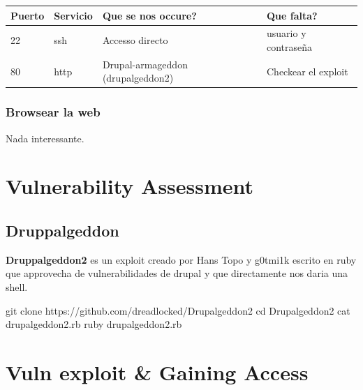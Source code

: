 \documentclass{assets/ipesethesis}
\newenvironment{Shaded}{\begin{snugshade}}{\end{snugshade}}
\newcommand{\BuiltInTok}[1]{#1}
\newcommand{\ExtensionTok}[1]{#1}
\newcommand{\FunctionTok}[1]{\textcolor[rgb]{0.00,0.00,0.00}{#1}}
\newcommand{\NormalTok}[1]{#1}
\begin{document}
\begin{longtable}[]{@{}llll@{}}
\toprule
Puerto & Servicio & Que se nos occure? & Que falta?\tabularnewline
\midrule
\endhead
22 & ssh & Accesso directo & usuario y contraseña\tabularnewline
80 & http & Drupal-armageddon (drupalgeddon2) & Checkear el exploit\tabularnewline
\bottomrule
\end{longtable}

\hypertarget{browsear-la-web-2}{%
\subsubsection*{Browsear la web}\label{browsear-la-web-2}}

Nada interessante.

\hypertarget{vulnerability-assessment-2}{%
\section*{Vulnerability Assessment}\label{vulnerability-assessment-2}}

\hypertarget{druppalgeddon}{%
\subsection*{Druppalgeddon}\label{druppalgeddon}}

\textbf{Druppalgeddon2} es un exploit creado por Hans Topo y g0tmi1k escrito en ruby que approvecha de vulnerabilidades
de drupal y que directamente nos daria una shell.

\begin{Shaded}
\begin{Highlighting}[]
\FunctionTok{git}\NormalTok{ clone https://github.com/dreadlocked/Drupalgeddon2}
\BuiltInTok{cd}\NormalTok{ Drupalgeddon2}
\FunctionTok{cat}\NormalTok{ drupalgeddon2.rb}
\ExtensionTok{ruby}\NormalTok{ drupalgeddon2.rb}
\end{Highlighting}
\end{Shaded}

\hypertarget{vuln-exploit-gaining-access-2}{%
\section*{Vuln exploit \& Gaining Access}\label{vuln-exploit-gaining-access-2}}
\end{document}
